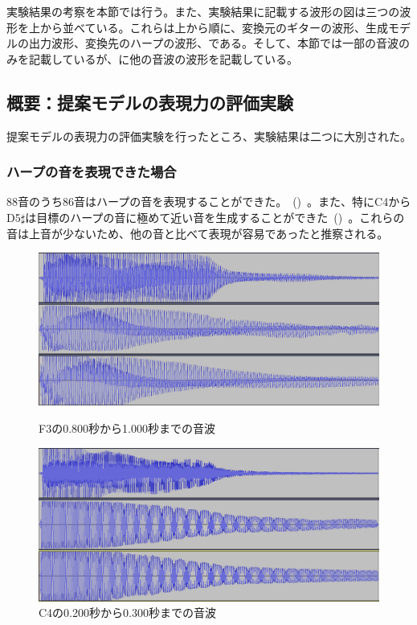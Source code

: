 実験結果の考察を本節では行う。また、実験結果に記載する波形の図は三つの波形を上から並べている。これらは上から順に、変換元のギターの波形、生成モデルの出力波形、変換先のハープの波形、である。そして、本節では一部の音波のみを記載しているが、に他の音波の波形を記載している。

\subsection{概要：提案モデルの表現力の評価実験}

提案モデルの表現力の評価実験を行ったところ、実験結果は二つに大別された。

\subsubsection{ハープの音を表現できた場合}

88音のうち86音はハープの音を表現することができた。~()~。また、特にC4からD5$\sharp$は目標のハープの音に極めて近い音を生成することができた~()~。これらの音は上音が少ないため、他の音と比べて表現が容易であったと推察される。

\begin{figure}[b]
\centering
\begin{minipage}{0.48\columnwidth}
\centering
\includegraphics[width=0.9\columnwidth]{figure/88_88/f3.png}
\caption[F3の音波]{F3の0.800秒から1.000秒までの音波}
\label{fig:88_88_good1}
\end{minipage}
\begin{minipage}{0.48\columnwidth}
\centering
\includegraphics[width=0.9\columnwidth]{figure/88_88/c4.png}
\caption[C4の音波]{C4の0.200秒から0.300秒までの音波}
\label{fig:88_88_good2}
\end{minipage}
\end{figure}

